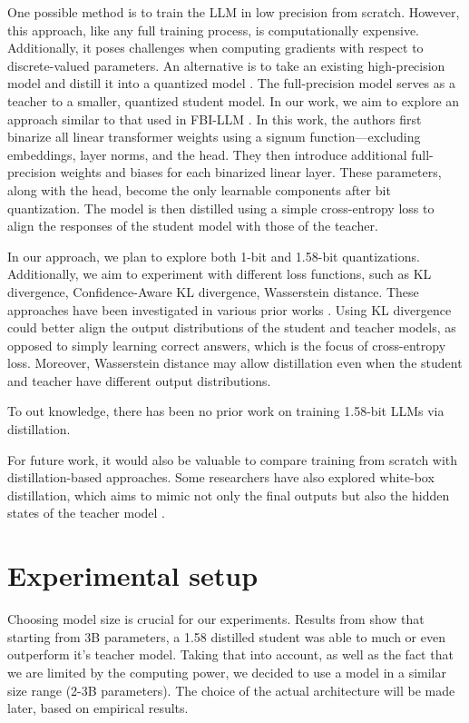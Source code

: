 \documentclass{article}
\begin{document}
One possible method is to train the LLM in low precision from scratch. However, this approach, like any full training process, is
computationally expensive. Additionally, it poses challenges when computing gradients with respect to discrete-valued parameters.
An alternative is to take an existing high-precision model and distill it into a quantized model
\cite{du2024bitdistillerunleashingpotentialsub4bit}. The full-precision model serves as a teacher to a smaller, quantized student model. 
In our work, we aim to explore an approach similar to that used in FBI-LLM \cite{fbillm}. In this work, the authors first binarize all 
linear transformer weights using a signum function—excluding embeddings, layer norms, and the head. They then introduce additional 
full-precision weights and biases for each binarized linear layer. These parameters, along with the head, become the only learnable 
components after bit quantization. The model is then distilled using a simple cross-entropy loss to align the responses of the student 
model with those of the teacher.

In our approach, we plan to explore both 1-bit and 1.58-bit quantizations. Additionally, we aim to experiment with different loss 
functions, such as KL divergence, Confidence-Aware KL divergence, Wasserstein distance. These approaches have been investigated in various
prior works \cite{boizard2025crosstokenizerdistillationuniversallogit, du2024bitdistillerunleashingpotentialsub4bit}. Using KL divergence 
could better align the output distributions of the student and teacher models, as opposed to simply learning correct answers, which is 
the focus of cross-entropy loss. Moreover, Wasserstein distance may allow distillation even when the student and teacher have different 
output distributions.

To out knowledge, there has been no prior work on training 1.58-bit LLMs via distillation.

For future work, it would also be valuable to compare training from scratch with distillation-based approaches. Some researchers 
have also explored white-box distillation, which aims to mimic not only the final outputs but also the hidden states of the teacher 
model \cite{gu2024minillmknowledgedistillationlarge}.

\section{Experimental setup}

Choosing model size is crucial for our experiments. Results from \cite{ma2024era1bitllmslarge} show that starting from 3B parameters, a 1.58 distilled student was able to much or even outperform it's teacher model. Taking that into account, as well as the fact that we are limited by the computing power, we decided to use a model in a similar size range (2-3B parameters). The choice of the actual architecture will be made later, based on empirical results.
\end{document}
